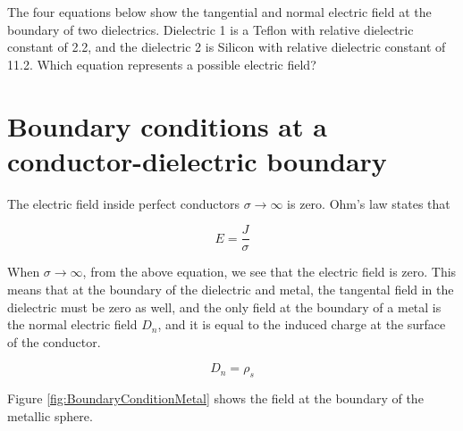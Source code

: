 \documentclass{ximera}
\begin{document}
\begin{problem}
 The four equations below show the tangential and normal electric field at the boundary of two dielectrics. Dielectric 1 is a Teflon with relative dielectric constant of 2.2, and the dielectric 2 is Silicon with relative dielectric constant of 11.2. Which equation represents a possible  electric field? 
 
 
   \begin{prompt}
   \begin{multipleChoice}
   \end{multipleChoice}
   \end{prompt}
   \end{problem}


\section{Boundary conditions at a conductor-dielectric boundary}

The electric field inside perfect conductors $\sigma \rightarrow \infty$ is zero. Ohm's law states that 

\begin{equation}
E=\frac{J}{\sigma}
\end{equation}


When $\sigma \rightarrow \infty$, from the above equation, we see that the electric field is zero. This means that at the boundary of the dielectric and metal, the tangental field in the dielectric must be zero as well, and the only field at the boundary of a metal is the normal electric field $D_n$, and it is equal to the induced charge at the surface of the conductor.

\begin{equation}
D_n = \rho_s
\end{equation}

Figure \ref{fig:BoundaryConditionMetal} shows the field at the boundary of the metallic sphere. 
\end{document}
